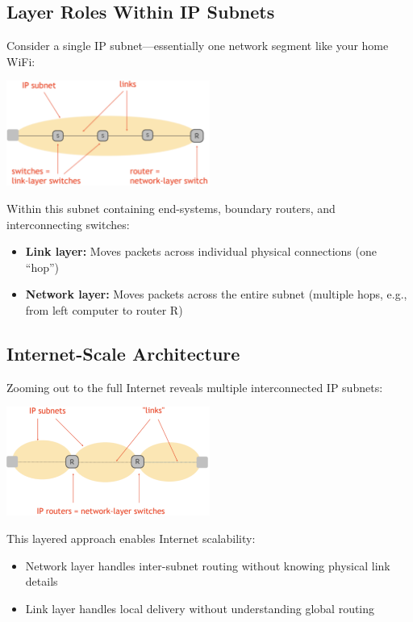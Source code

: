\documentclass[../../compsys.tex]{subfiles}
\begin{document}
\subsection{Layer Roles Within IP Subnets}

Consider a single IP subnet---essentially one network segment like your home WiFi:

\begin{center}
    \includegraphics[width=0.5\textwidth]{images/subnet.png}
\end{center}

Within this subnet containing end-systems, boundary routers, and interconnecting switches:

\begin{itemize}
    \item \textbf{Link layer:} Moves packets across individual physical connections (one ``hop'')
    \item \textbf{Network layer:} Moves packets across the entire subnet (multiple hops, e.g., from left computer to router R)
\end{itemize}

\subsection{Internet-Scale Architecture}

Zooming out to the full Internet reveals multiple interconnected IP subnets:

\begin{center}
    \includegraphics[width=0.5\textwidth]{images/internet-subnets.png}
\end{center}

This layered approach enables Internet scalability:
\begin{itemize}
    \item Network layer handles inter-subnet routing without knowing physical link details
    \item Link layer handles local delivery without understanding global routing
\end{itemize}
\end{document}
